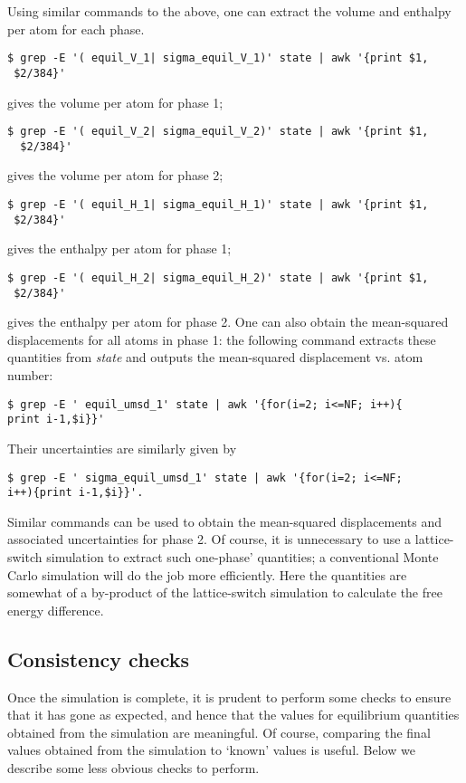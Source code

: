 \documentclass{report}
\begin{document}
Using similar commands to the above, one can extract the volume and enthalpy per atom for each phase.
\begin{verbatim}
$ grep -E '( equil_V_1| sigma_equil_V_1)' state | awk '{print $1,
 $2/384}'
\end{verbatim}
gives the volume per atom for phase 1;
\begin{verbatim}
$ grep -E '( equil_V_2| sigma_equil_V_2)' state | awk '{print $1,
  $2/384}'
\end{verbatim}
gives the volume per atom for phase 2;
\begin{verbatim}
$ grep -E '( equil_H_1| sigma_equil_H_1)' state | awk '{print $1,
 $2/384}'
\end{verbatim}
gives the enthalpy per atom for phase 1;
\begin{verbatim}
$ grep -E '( equil_H_2| sigma_equil_H_2)' state | awk '{print $1,
 $2/384}'
\end{verbatim}
gives the enthalpy per atom for phase 2. One can also obtain the mean-squared displacements for all atoms in phase 1: the following command extracts
these quantities from \emph{state} and outputs the mean-squared displacement vs. atom number:
\begin{verbatim}
$ grep -E ' equil_umsd_1' state | awk '{for(i=2; i<=NF; i++){
print i-1,$i}}'
\end{verbatim}
Their uncertainties are similarly given by 
\begin{verbatim}
$ grep -E ' sigma_equil_umsd_1' state | awk '{for(i=2; i<=NF; 
i++){print i-1,$i}}'.
\end{verbatim}
Similar commands can be used to obtain the mean-squared displacements and associated uncertainties for phase 2. Of course, it is unnecessary to use
a lattice-switch simulation to extract such one-phase' quantities; a conventional Monte Carlo simulation will do the job more efficiently.
Here the quantities are somewhat of a by-product of the lattice-switch simulation to calculate the free energy difference.

\subsection{Consistency checks}
Once the simulation is complete, it is prudent to perform some checks to ensure that it has gone as expected, and hence that the values for equilibrium
quantities obtained from the simulation are meaningful. Of course, comparing the final values obtained from the simulation to `known' values is useful.
Below we describe some less obvious checks to perform.
\end{document}
